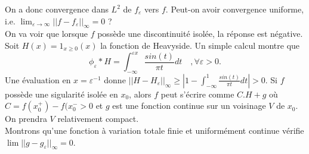 On a donc convergence dans $L^2$ de $f_\varepsilon$ vers $f$. Peut-on avoir convergence uniforme, i.e. $\lim_{\varepsilon \rightarrow \infty}||f-f_\varepsilon||_\infty=0$ ?\\

On va voir que lorsque $f$ possède une discontinuité isolée, la réponse est négative. \\

Soit $H(x)=1_{x\geq 0}(x)$ la fonction de Heavyside. Un simple calcul montre que 
\[\phi_\varepsilon \ast H = \int_{-\infty}^{\varepsilon x} \frac{sin(t)}{\pi t}dt\quad,\forall \varepsilon>0.\]
Une évaluation en $x=\varepsilon^{-1}$ donne $||H-H_\varepsilon||_\infty\geq |1-\int_{-\infty}^{1} \frac{sin(t)}{\pi t}dt|>0$. Si $f$ possède une sigularité isolée en $x_0$, alors $f$ peut s'écrire comme $C.H+g$ où $C=f(x_0^+)-f(x_0^{-}>0$ et $g$ est une fonction continue sur un voisinage $V$ de $x_0$. On prendra $V$ relativement compact.\\

Montrons qu'une fonction à variation totale finie et uniformément continue vérifie $\lim ||g-g_\varepsilon||_\infty =0 $.\\
